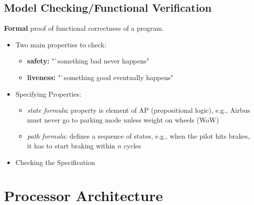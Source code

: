 \documentclass[fs, footer]{latex4ei}
\begin{document}
\begin{multicols*}{4}
{\subsection{Model Checking/Functional Verification}
\textbf{Formal} proof of functional correctness of a program.
\begin{itemize}
\item Two main properties to check:
\begin{itemize}
\item \textbf{safety:} "`something bad never happens"
\item \textbf{liveness:} "`something good eventually happens"
\end{itemize}
\item Specifying Properties:
\begin{itemize}
\item \textit{state formula}: property is element of AP (propositional logic), e.g., Airbus must never go to parking mode unless
weight on wheels (WoW)
\item \textit{path formula:} defines a sequence of states, e.g., when the pilot hits brakes, it has to start braking within $n$ cycles
\end{itemize}
\item Checking the Specification
\end{itemize}
}

\section{Processor Architecture}
\end{multicols*}
\end{document}
